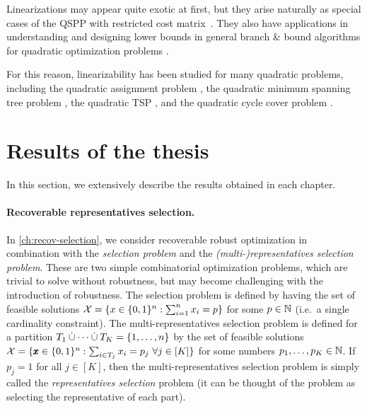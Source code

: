 Linearizations may appear quite exotic at first, but they arise naturally as special cases of the QSPP with restricted cost matrix~\cite{huSo2018}. They also have applications in understanding and designing lower bounds in general branch \& bound algorithms for quadratic optimization problems \cite{huSo2021}. 

For this reason, linearizability has been studied for many quadratic problems, including the quadratic assignment problem
 \cite{CeDeWo2016,Erdogan2006,ErTa2007,ErTa2011,kabadi2011n,punnen2013linear,waddellcharacterizing}, 
 the quadratic minimum spanning tree problem \cite{CuPu2018,sotirov2021quadratic},   the quadratic TSP \cite{PuWaWo2017}, and  the quadratic cycle cover problem \cite{deMeSo2020}.  


\section{Results of the thesis}
\label{sec:thesis-results}

In this section, we extensively describe the results obtained in each chapter.

\paragraph*{Recoverable representatives selection.}
In \cref{ch:recov-selection}, we consider recoverable robust optimization in combination with the \emph{selection problem} and the \emph{(multi-)representatives selection problem}. 
These are two simple combinatorial optimization problems, which are trivial to solve without robustness, but may become challenging with the introduction of robustness. 
The selection problem is defined by having the set of feasible solutions $\mathcal{X} = \{ x \in \{ 0,1 \}^n : \sum_{i=1}^n x_i = p \}$ for some $p \in \mathbb{N}$ (i.e.\ a single cardinality constraint). 
The multi-representatives selection problem is defined for a partition $T_1 \dotunion \dots \dotunion T_K = \fromto{1}{n}$ by the set of feasible solutions $\mathcal{X} = \{  \pmb{x}\in \{0,1\}^n : \sum_{i\in T_j} x_i = p_j\ \forall j \in [K]  \}$ for some numbers $p_1,\dots,p_K \in \mathbb{N}$. If $p_j = 1$ for all $j \in [K]$, then the multi-representatives selection problem is simply called the \emph{representatives selection} problem (it can be thought of the problem as selecting the representative of each part).

